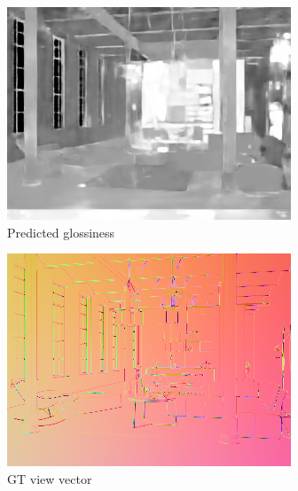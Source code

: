 \begin{figure}
\begin{subfigure}{0.32\linewidth}
    \includegraphics[width=\linewidth]{praca/images/AI46_009_Cam01.VRayLightSelect_RE_L0.glossiness_output.png}
    \caption{Predicted glossiness}
  \end{subfigure}
  \begin{subfigure}{0.32\linewidth}
    \includegraphics[width=\linewidth]{praca/images/AI46_009_Cam01.VRayLightSelect_RE_L0.view.png}
    \caption{GT view vector}
  \end{subfigure}
  \begin{subfigure}{0.32\linewidth}

\end{subfigure}
\end{figure}
